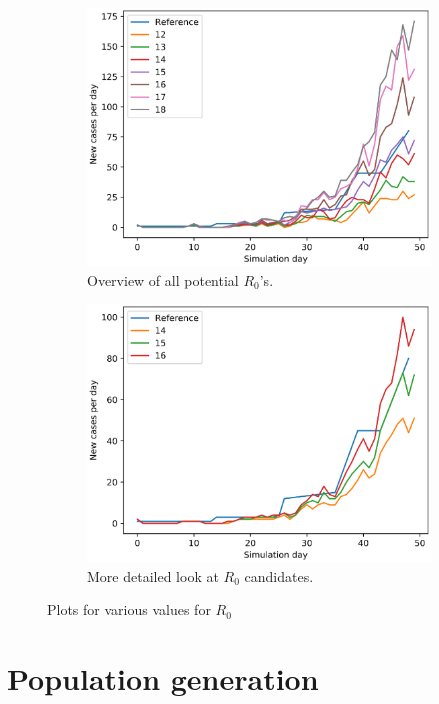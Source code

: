 \documentclass[runningheads]{llncs}
\begin{document}
\begin{figure}[h!]
	\centering
	\begin{subfigure}[b]{0.7\linewidth}
		\includegraphics[width=\textwidth]{R0_all_20runs.eps}
		\caption{Overview of all potential $R_0$'s.} 	
	\end{subfigure}
	\begin{subfigure}[b]{0.7\linewidth}
		\includegraphics[width=\textwidth]{R0_detail_30runs.eps}
		\caption{More detailed look at $R_0$ candidates.} 
	\end{subfigure}
	\caption{Plots for various values for $R_0$}
	\label{R0EstPlot}
\end{figure}

\section{Population generation}
\end{document}
